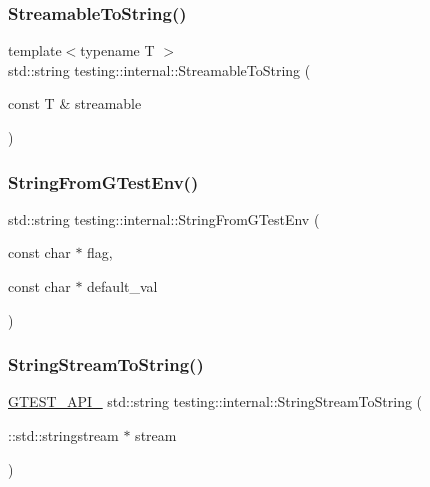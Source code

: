 \mbox{\label{namespacetesting_1_1internal_aad4beed95d0846e6ffc5da0978ef3bb9}} 
\subsubsection{\texorpdfstring{StreamableToString()}{StreamableToString()}}
{\footnotesize\ttfamily template$<$typename T $>$ \\
std\+::string testing\+::internal\+::\+Streamable\+To\+String (\begin{DoxyParamCaption}\item[{const T \&}]{streamable }\end{DoxyParamCaption})}

\mbox{\label{namespacetesting_1_1internal_ac54dabc540bf79c2de91add679bfb93b}} 
\subsubsection{\texorpdfstring{StringFromGTestEnv()}{StringFromGTestEnv()}}
{\footnotesize\ttfamily std\+::string testing\+::internal\+::\+String\+From\+G\+Test\+Env (\begin{DoxyParamCaption}\item[{const char $\ast$}]{flag,  }\item[{const char $\ast$}]{default\+\_\+val }\end{DoxyParamCaption})}

\mbox{\label{namespacetesting_1_1internal_a75bdbc38815772055696b2a40bae614e}} 
\subsubsection{\texorpdfstring{StringStreamToString()}{StringStreamToString()}}
{\footnotesize\ttfamily \mbox{\hyperlink{gtest-port_8h_aa73be6f0ba4a7456180a94904ce17790}{G\+T\+E\+S\+T\+\_\+\+A\+P\+I\+\_\+}} std\+::string testing\+::internal\+::\+String\+Stream\+To\+String (\begin{DoxyParamCaption}\item[{\+::std\+::stringstream $\ast$}]{stream }\end{DoxyParamCaption})}

